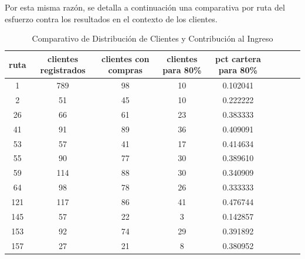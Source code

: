 \documentclass[12pt, letterpaper]{article}
\begin{document}
Por esta misma razón, se detalla a continuación una comparativa por ruta del esfuerzo contra los resultados en el contexto de los clientes.

\begin{table}[htbp]
\caption{Comparativo de Distribución de Clientes y Contribución al Ingreso}
\label{tab:distribucion_pareto}
\begin{tabular}{ccccccccc}
\toprule
ruta & clientes registrados & clientes con compras & clientes para 80\% & pct cartera para 80\% \\
\midrule
1 & 789 & 98 & 10 & 0.102041 \\
2 & 51 & 45 & 10 & 0.222222 \\
26 & 66 & 61 & 23 & 0.383333 \\
41 & 91 & 89 & 36 & 0.409091 \\
53 & 57 & 41 & 17 & 0.414634 \\
55 & 90 & 77 & 30 & 0.389610 \\
59 & 114 & 88 & 30 & 0.340909 \\
64 & 98 & 78 & 26 & 0.333333 \\
121 & 117 & 86 & 41 & 0.476744 \\
145 & 57 & 22 & 3 & 0.142857 \\
153 & 92 & 74 & 29 & 0.391892 \\
157 & 27 & 21 & 8 & 0.380952 \\
\bottomrule
\end{tabular}
\end{table}
 
\newpage
\printglossary[title={Glosario de Términos}, toctitle={Glosario}]
\end{document}
